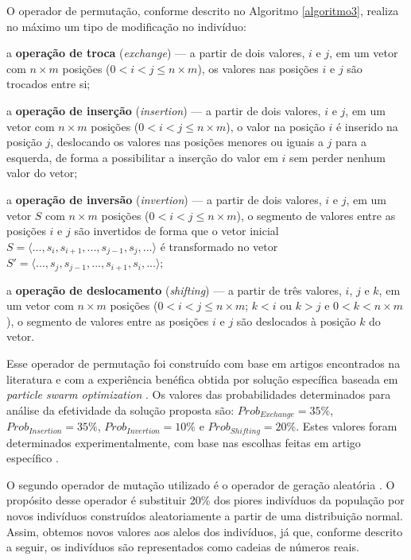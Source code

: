 \documentclass[relatorio,nocolorlinks]{inf-ufg}
\begin{document}
O operador de permuta\c{c}\~{a}o, conforme descrito no Algoritmo \ref{algoritmo3}, realiza no m\'{a}ximo um tipo de modifica\c{c}\~{a}o no
indiv\'{i}duo:
\begin{inparaenum}
\item a \textbf{opera\c{c}\~{a}o de troca} (\textit{exchange}) --- a partir de dois valores, $i$ e $j$, em um vetor com $n \times m$ posi\c{c}\~{o}es
($0 < i < j \leq n \times m$), os valores nas posi\c{c}\~{o}es $i$ e $j$ s\~{a}o trocados entre si;
\item a \textbf{opera\c{c}\~{a}o de inser\c{c}\~{a}o} (\textit{insertion}) --- a partir de dois valores, $i$ e $j$, em um vetor com $n \times m$
posi\c{c}\~{o}es ($0 < i < j \leq n \times m$), o valor na posi\c{c}\~{a}o $i$ \'{e} inserido na posi\c{c}\~{a}o $j$, deslocando os valores nas
posi\c{c}\~{o}es menores ou iguais a $j$ para a esquerda, de forma a possibilitar a inser\c{c}\~{a}o do valor em $i$ sem perder nenhum valor do vetor;
\item a \textbf{opera\c{c}\~{a}o de invers\~{a}o} (\textit{invertion}) --- a partir de dois valores, $i$ e $j$, em um vetor $S$ com $n \times m$
posi\c{c}\~{o}es ($0 < i < j \leq n \times m$), o segmento de valores entre as posi\c{c}\~{o}es $i$ e $j$ s\~{a}o invertidos de forma que o vetor
inicial $S = \langle..., s_{i}, s_{i+1}, ..., s_{j-1}, s_{j}, ...\rangle$ \'{e} transformado no vetor
$S' = \langle..., s_{j}, s_{j-1}, ..., s_{i+1}, s_{i}, ...\rangle$;
\item a \textbf{opera\c{c}\~{a}o de deslocamento} (\textit{shifting}) --- a partir de tr\^{e}s valores, $i$, $j$ e $k$, em um vetor
com $n \times m$ posi\c{c}\~{o}es ($0 < i < j \leq n \times m$; $k < i$ ou $k > j$ e $0 < k < n \times m$), o segmento de valores entre as
posi\c{c}\~{o}es $i$ e $j$ s\~{a}o deslocados \`{a} posi\c{c}\~{a}o $k$ do vetor.
\end{inparaenum}
Esse operador de permuta\c{c}\~{a}o foi constru\'{i}do com base em artigos encontrados na literatura e com a experi\^{e}ncia ben\'{e}fica obtida
por solu\c{c}\~{a}o espec\'{i}fica baseada em \textit{particle swarm optimization} \cite{Lin2010}. Os valores das probabilidades determinados
para an\'{a}lise da efetividade da solu\c{c}\~{a}o proposta s\~{a}o: $Prob_{Exchange} = 35\%$, $Prob_{Insertion} = 35\%$, $Prob_{Invertion} = 10\%$ e
$Prob_{Shifting} = 20\%$. Estes valores foram determinados experimentalmente, com base nas escolhas feitas em artigo espec\'{i}fico \cite{Lin2010}.

O segundo operador de muta\c{c}\~{a}o utilizado \'{e} o operador de gera\c{c}\~{a}o aleat\'{o}ria \cite{Goncalves2002}. O prop\'{o}sito desse operador
\'{e} substituir 20\% dos piores indiv\'{i}duos da popula\c{c}\~{a}o por novos indiv\'{i}duos constru\'{i}dos aleatoriamente a partir de uma
distribui\c{c}\~{a}o normal. Assim, obtemos novos valores aos alelos dos indiv\'{i}duos, j\'{a} que, conforme descrito a seguir, os indiv\'{i}duos
s\~{a}o representados como cadeias de n\'{u}meros reais.
\end{document}
